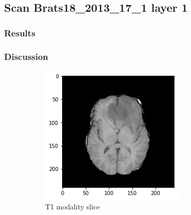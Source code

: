 \subsection{Scan Brats18\_2013\_17\_1 layer 1}
\subsubsection{Results}

\subsubsection{Discussion}


\begin{figure}[H]
    \centering
    \begin{subfigure}[t]{.215\textwidth}
        \centering
        \includegraphics[width=\linewidth]{chapters/06_hdm/c_Brats18_2013_17_1_L1/41.png}
        \caption{T1 modality slice}
    \end{subfigure}%
    \begin{subfigure}[t]{.215\textwidth}
        \centering

\end{subfigure}
\end{figure}
